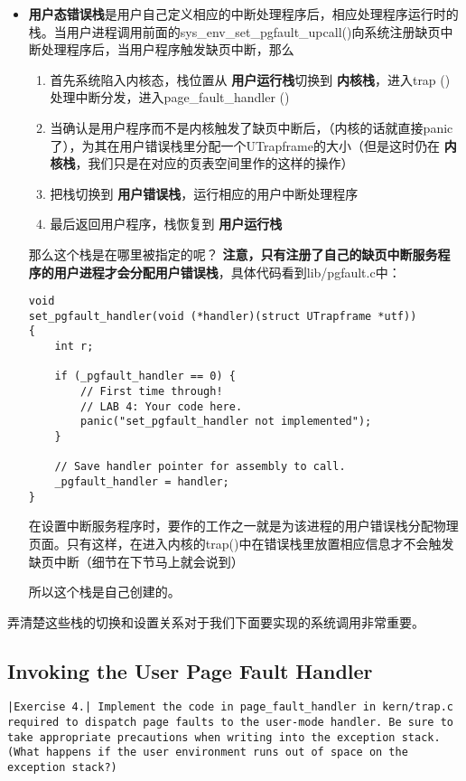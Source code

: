 \documentclass{article}
\newcommand{\highlight}[1]{{\bfseries \color{red}  #1}}
\newcommand{\funcname}[1]{{\ttfamily \small #1}}
\begin{document}
\begin{CJK*}{UTF8}{gkai}
\begin{itemize}
\item{\highlight{用户态错误栈}是用户自己定义相应的中断处理程序后，相应处理程序运行时的栈。当用户进程调用前面的\funcname{sys\_env\_set\_pgfault\_upcall()}向系统注册缺页中断处理程序后，当用户程序触发缺页中断，那么
\begin{enumerate}
\item{首先系统陷入内核态，栈位置从\highlight{用户运行栈}切换到\highlight{内核栈}，进入trap ()处理中断分发，进入page\_fault\_handler ()}
\item{当确认是用户程序而不是内核触发了缺页中断后，（内核的话就直接panic了），为其在用户错误栈里分配一个UTrapframe的大小（但是这时仍在\highlight{内核栈}，我们只是在对应的页表空间里作的这样的操作）}
\item{把栈切换到\highlight{用户错误栈}，运行相应的用户中断处理程序}
\item{最后返回用户程序，栈恢复到\highlight{用户运行栈}}
\end{enumerate}

那么这个栈是在哪里被指定的呢？\highlight{注意，只有注册了自己的缺页中断服务程序的用户进程才会分配用户错误栈}，具体代码看到lib/pgfault.c中：

\begin{lstlisting}[style=ccode, title={\scriptsize \ttfamily \bfseries lib/pgfault.c: set\_pgfault\_handler()}]
void
set_pgfault_handler(void (*handler)(struct UTrapframe *utf))
{
	int r;

	if (_pgfault_handler == 0) {
		// First time through!
		// LAB 4: Your code here.
		panic("set_pgfault_handler not implemented");
	}

	// Save handler pointer for assembly to call.
	_pgfault_handler = handler;
}
\end{lstlisting}

在设置中断服务程序时，要作的工作之一就是为该进程的用户错误栈分配物理页面。只有这样，在进入内核的trap()中在错误栈里放置相应信息才不会触发缺页中断（细节在下节马上就会说到）

所以这个栈是自己创建的。
}
\end{itemize}

弄清楚这些栈的切换和设置关系对于我们下面要实现的系统调用非常重要。




\subsection{Invoking the User Page Fault Handler}


\begin{lstlisting}[style=exercise]
|Exercise 4.| Implement the code in page_fault_handler in kern/trap.c required to dispatch page faults to the user-mode handler. Be sure to take appropriate precautions when writing into the exception stack. (What happens if the user environment runs out of space on the exception stack?)
\end{lstlisting}


\end{CJK*}
\end{document}
